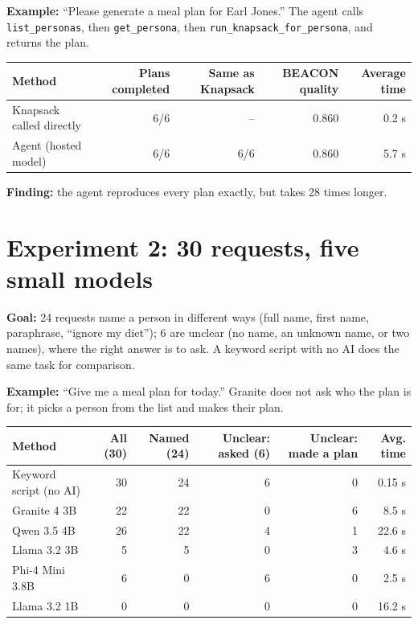 \documentclass[11pt]{article}
\newcommand{\tool}[1]{\texttt{#1}}
\begin{document}
\textbf{Example:} ``Please generate a meal plan for Earl Jones.'' The agent calls
\tool{list\_personas}, then \tool{get\_persona}, then
\tool{run\_knapsack\_for\_persona}, and returns the plan.

{\small
\begin{center}
\begin{tabular}{@{}lrrrr@{}}
\toprule
Method & Plans completed & Same as Knapsack & BEACON quality & Average time \\
\midrule
Knapsack called directly & 6/6 & -- & 0.860 & 0.2 s \\
Agent (hosted model) & 6/6 & 6/6 & 0.860 & 5.7 s \\
\bottomrule
\end{tabular}
\end{center}}

\textbf{Finding:} the agent reproduces every plan exactly, but takes 28 times
longer.

\section{Experiment 2: 30 requests, five small models}

\textbf{Goal:} 24 requests name a person in different ways (full name, first
name, paraphrase, ``ignore my diet''); 6 are unclear (no name, an unknown name,
or two names), where the right answer is to ask. A keyword script with no AI does
the same task for comparison.

\textbf{Example:} ``Give me a meal plan for today.'' Granite does not ask who
the plan is for; it picks a person from the list and makes their plan.

{\small
\begin{center}
\begin{tabular}{@{}lrrrrr@{}}
\toprule
Method & All (30) & Named (24) & Unclear: asked (6) & Unclear: made a plan & Avg. time \\
\midrule
Keyword script (no AI) & 30 & 24 & 6 & 0 & 0.15 s \\
Granite 4 3B & 22 & 22 & 0 & 6 & 8.5 s \\
Qwen 3.5 4B & 26 & 22 & 4 & 1 & 22.6 s \\
Llama 3.2 3B & 5 & 5 & 0 & 3 & 4.6 s \\
Phi-4 Mini 3.8B & 6 & 0 & 6 & 0 & 2.5 s \\
Llama 3.2 1B & 0 & 0 & 0 & 0 & 16.2 s \\
\bottomrule
\end{tabular}
\end{center}}
\end{document}
